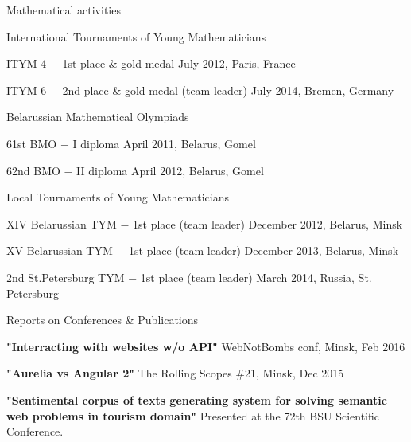 \documentclass{resume} %
\begin{document}
\begin{rSection}{Mathematical activities}

\begin{rSubsection}{International Tournaments of Young Mathematicians}{}{}

\item ITYM 4 $-$ 1st place \& gold medal \hfill July 2012, Paris, France
\item ITYM 6 $-$ 2nd place \& gold medal (team leader) \hfill July 2014, Bremen, Germany

\end{rSubsection}

\begin{rSubsection}{Belarussian Mathematical Olympiads}{}{}

\item 61st BMO $-$ I diploma \hfill  April 2011, Belarus, Gomel
\item 62nd BMO $-$ II diploma \hfill April 2012, Belarus, Gomel
\end{rSubsection}


\begin{rSubsection}{Local Tournaments of Young Mathematicians}{}{}

\item XIV Belarussian TYM $-$ 1st place (team leader) \hfill December 2012, Belarus, Minsk
\item XV Belarussian TYM $-$ 1st place (team leader) \hfill December 2013, Belarus, Minsk
\item 2nd St.Petersburg TYM $-$ 1st place (team leader) \hfill March 2014, Russia, St. Petersburg
\end{rSubsection}

\end{rSection}

\begin{rSection}{Reports on Conferences & Publications}

{\bf "Interracting with websites w/o API"} WebNotBombs conf, Minsk, Feb 2016

{\bf "Aurelia vs Angular 2"} The Rolling Scopes \#21, Minsk, Dec 2015

{\bf "Sentimental corpus of texts generating system for solving semantic web problems in tourism domain"}
Presented at the 72th BSU Scientific Conference.

\end{rSection}






\end{document}
